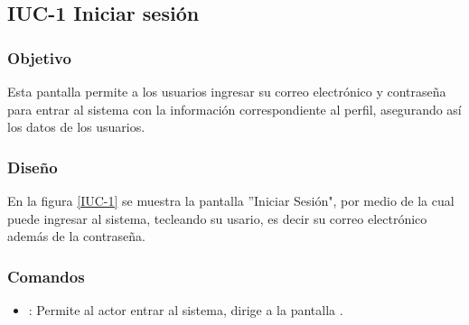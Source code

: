 \subsection{IUC-1 Iniciar sesión}

\subsubsection{Objetivo}
	
Esta pantalla permite a los usuarios ingresar su correo electrónico y contraseña para entrar al sistema con la información correspondiente al perfil, asegurando así los datos de los usuarios.

\subsubsection{Diseño}

    En la figura \ref{IUC-1} se muestra la pantalla ''Iniciar Sesión", por medio de la cual puede ingresar al sistema, tecleando su usario, es decir su correo electrónico además de la contraseña. 
 

\subsubsection{Comandos}
    \begin{itemize}
	\item {}: Permite al actor entrar al sistema, dirige a la pantalla .
    \end{itemize}
